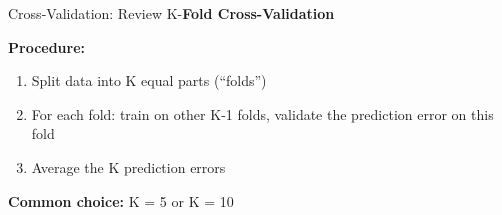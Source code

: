 \documentclass[10pt]{beamer}
\begin{document}

\begin{frame}{Cross-Validation: Review}
  K-\textbf{Fold Cross-Validation}
  
  \begin{center}
  \end{center}
  
  \textbf{Procedure:}
  \begin{enumerate}
    \item Split data into K equal parts (``folds'')
    \item For each fold: train on other K-1 folds, validate the prediction error on this fold
    \item Average the K prediction errors
  \end{enumerate}
  
  \textbf{Common choice:} K = 5 or K = 10
\end{frame}


\end{document}
